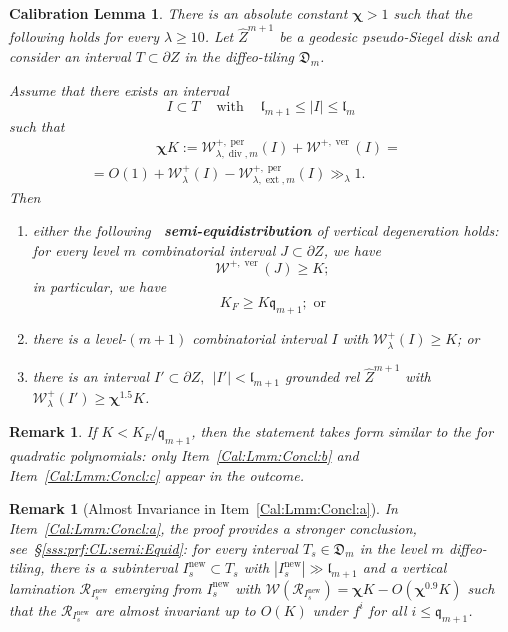 \documentclass{amsart}
\renewcommand{\sp}{{\ \ }}
\newcommand{\1}{{\mathbb 1 }}
\newcommand{\ext}{{\operatorname{ext}}}
\renewcommand{\div}{{\operatorname{div}}}
\newcommand{\Width}{{\mathcal W}}
\newcommand\RR{\mathcal{R}}
\newcommand{\wZ}{{\widehat Z}}
\newcommand{\qq}{\mathfrak{q}}
\newcommand{\length}{{\mathfrak l}}
\newcommand\new{{\operatorname{new}}}
\newcommand\ver{{\operatorname{ver}}}
\newcommand\per{{\operatorname{per}}}
\newcommand{\Dbb}{{\mathfrak{D}}}
\newtheorem{rem}[thm]{Remark}
\newtheorem{caliblem}[thm]{Calibration Lemma}
\theoremstyle{remark}
\numberwithin{equation}{section}
\theoremstyle{definition}
\newcommand{\bchi}{{\boldsymbol{ \chi}}}
\begin{document}
\begin{caliblem}
\label{lmm:CalibrLmm}
There is an absolute constant $\bchi> 1$ such that the following holds for every $\lambda\ge 10$. Let $\wZ^{m+1}$ be a geodesic pseudo-Siegel disk and consider an interval $T\subset\partial Z$ in the diffeo-tiling $\Dbb_m$. 


Assume that there exists an interval \[I\subset T\sp\sp 
\text{ with }\sp\sp \length_{m+1} \le |I|\le \length_{m}
\]
such that
\begin{multline}\label{eq:CalLemm:chiK}
\hspace{2cm}\bchi K := \Width^{+,\per}_{\lambda, \div,m}(I)+\Width^{+,\ver}(I) = \\ =O(1)+\Width^{+}_{\lambda}(I)-\Width^{+,\per}_{\lambda, \ext, m}(I)\gg_{\lambda} 1.\hspace{2cm}\end{multline}
Then 
\begin{enumerate}[label=\text{(\Roman*)},font=\normalfont,leftmargin=*]

\item \label{Cal:Lmm:Concl:a} either the following {\bf~semi-equidistribution} of vertical degeneration holds: for every level $m$ combinatorial interval $J\subset\partial Z$, we have \[\Width^{+,\ver}(J)\ge  K;\] in particular, we have \[K_F\ge K \qq_{m+1}; \text{ or}\] 

\item \label{Cal:Lmm:Concl:b} there is a level-$(m+1)$ combinatorial interval $I$ with $\Width^+_{\lambda}(I) \geq K$; or

\item \label{Cal:Lmm:Concl:c} there is an interval $I'\subset \partial Z,\sp |I'|<\length_{m+1}$ grounded rel $\wZ^{m+1}$ with $\Width^+_{\lambda}(I') \geq \bchi^{1.5} K$.
\end{enumerate}
\end{caliblem}


\begin{rem}\label{rem:CalLmm} If $K < K_F/\qq_{m+1}$, then the statement takes form similar to the \cite[Calibration Lemma 9.1]{DL:sector bounds} for quadratic polynomials: only Item~\ref{Cal:Lmm:Concl:b} and Item~\ref{Cal:Lmm:Concl:c} appear in the outcome.
\end{rem}


\begin{rem}[Almost Invariance in Item~\ref{Cal:Lmm:Concl:a}]\label{rem:CalLmm:AI}
In Item~\ref{Cal:Lmm:Concl:a}, the proof provides a stronger conclusion, see~\S\ref{sss:prf:CL:semi:Equid}: for every interval $T_s\in \Dbb_m$ in the level $m$ diffeo-tiling, there is a subinterval  $I^\new_s\subset T_s$ with $|I^\new_s|\gg \length_{m+1}$ and a vertical lamination $\RR_{I^\new_s}$ emerging from $I^\new_s$ with $\Width(\RR_{I_s^\new})=\bchi K -O(\bchi^{0.9} K)$ such that the $\RR_{I^\new_s}$ are almost invariant up to $O(K)$  under $f^i$ for all $i\le \qq_{m+1}$.
\end{rem}
\end{document}
